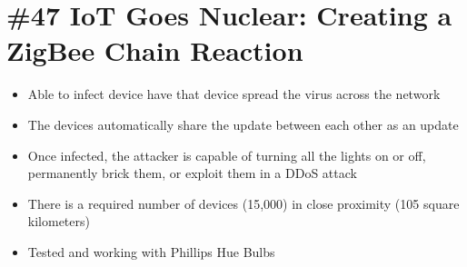 \section{\#47 IoT Goes Nuclear: Creating a ZigBee Chain Reaction}
\begin{itemize}
	\item Able to infect device have that device spread the virus across the network
	\item The devices automatically share the update between each other as an update
	\item Once infected, the attacker is capable of turning all the lights on or off, permanently brick them, or exploit them in a DDoS attack
	\item There is a required number of devices (15,000) in close proximity (105 square kilometers)
	\item Tested and working with Phillips Hue Bulbs
\end{itemize}